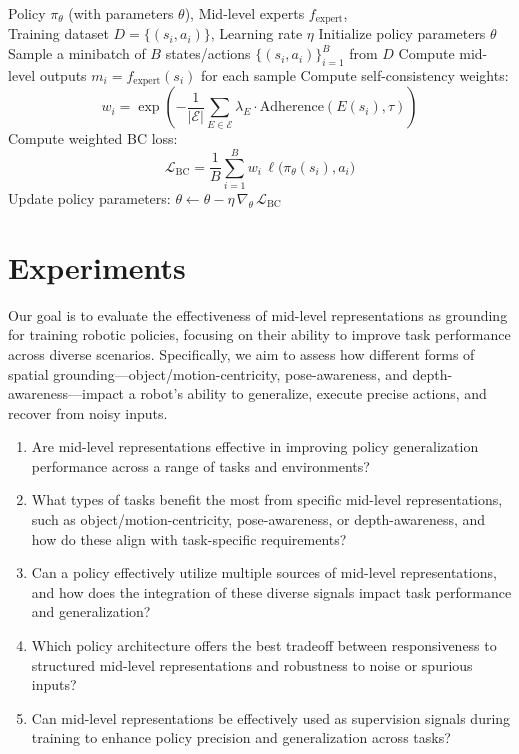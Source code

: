 \documentclass[conference,dvipsnames]{IEEEtran}
\begin{document}
\begin{algorithm}[t]
\caption{Weighted Self-Consistency Training}
\label{alg:self-consistency}
\begin{algorithmic}[1]
\REQUIRE Policy $\pi_\theta$ (with parameters $\theta$), Mid-level experts $f_{\text{expert}}$,\\ 
Training dataset $D=\{(s_i,a_i)\}$, Learning rate $\eta$
\vspace{5pt}
\STATE Initialize policy parameters $\theta$
\REPEAT
  \STATE Sample a minibatch of $B$ states/actions $\{(s_i,a_i)\}_{i=1}^B$ from $D$
  \STATE Compute mid-level outputs $m_i = f_{\text{expert}}(s_i)$ for each sample
  \STATE Compute self-consistency weights: \\
  \[
    w_i = \exp\left( -\frac{1}{|\mathcal{E}|} \sum_{E \in \mathcal{E}} \lambda_E \cdot \text{Adherence}(E(s_i), \tau) \right)
  \]
  \STATE Compute weighted BC loss: 
  \[
    \mathcal{L}_{\text{BC}} = \frac{1}{B}\sum_{i=1}^B w_i \,\ell\bigl(\pi_\theta(s_i), a_i\bigr)
  \]
  \STATE Update policy parameters: $\theta \leftarrow \theta - \eta \,\nabla_\theta \,\mathcal{L}_{\text{BC}}$
\end{algorithmic}
\end{algorithm}


\section{Experiments}

Our goal is to evaluate the effectiveness of mid-level representations as grounding for training robotic policies, focusing on their ability to improve task performance across diverse scenarios. Specifically, we aim to assess how different forms of spatial grounding—object/motion-centricity, pose-awareness, and depth-awareness—impact a robot's ability to generalize, execute precise actions, and recover from noisy inputs.


\begin{enumerate}
\item Are mid-level representations effective in improving policy generalization performance across a range of tasks and environments?
\item What types of tasks benefit the most from specific mid-level representations, such as object/motion-centricity, pose-awareness, or depth-awareness, and how do these align with task-specific requirements?
\item Can a policy effectively utilize multiple sources of mid-level representations, and how does the integration of these diverse signals impact task performance and generalization?
\item Which policy architecture offers the best tradeoff between responsiveness to structured mid-level representations and robustness to noise or spurious inputs?
\item Can mid-level representations be effectively used as supervision signals during training to enhance policy precision and generalization across tasks?
\end{enumerate}
\end{document}

